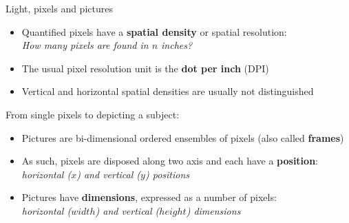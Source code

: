 \begin{frame}{Light, pixels and pictures}
  \begin{itemize}
  \item Quantified pixels have a \textbf{spatial density} or spatial resolution:\\
  \textit{How many pixels are found in \(n\) inches?}
  \item The usual pixel resolution unit is the \textbf{dot per inch} (DPI)
  \item Vertical and horizontal spatial densities are usually not distinguished
  \end{itemize}

  \begin{center}
  From single pixels to depicting a subject:
  \end{center}

  \begin{itemize}
  \item Pictures are bi-dimensional ordered ensembles of pixels (also called \textbf{frames})
  \item As such, pixels are disposed along two axis and each have a \textbf{position}:\\
   \textit{horizontal (\(x\)) and vertical (\(y\)) positions}
  \item Pictures have \textbf{dimensions}, expressed as a number of pixels:\\
   \textit{horizontal (\(width\)) and vertical (\(height\)) dimensions}
  \end{itemize}

\end{frame}

